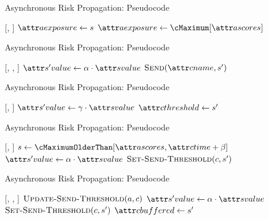 \documentclass[11pt]{beamer}
\begin{document}
\begin{frame}{Asynchronous Risk Propagation: Pseudocode}
\begin{function}{\nUpdateExposureScore}[\vActor, \vScore]
  \If{$\aActorExposureValue < \aScoreValue$}
    \pause
    \State $\aActorExposure \assign \vScore$
  \pause
    \pause
    \State $\aActorExposure \assign \cMaximum[\aActorScores]$
  \EndIf
\end{function}
\end{frame}

\begin{frame}{Asynchronous Risk Propagation: Pseudocode}
\begin{function}{\nApplyRiskScore}[\vActor, \vContact, \vScore]
  \If{$\aContactTime + \pTimeBuffer > \aScoreTime$}
    \pause
    \State $\aNewScoreValue \assign \pTransmissionRate \cdot \aScoreValue$
    \pause
    \State $\cSend[\aContactName, \vNewScore]$
  \EndIf
\end{function}
\end{frame}

\begin{frame}{Asynchronous Risk Propagation: Pseudocode}
\begin{function}{\nSetSendThreshold}[\vContact, \vScore]
  \State $\aNewScoreValue \assign \pSendCoefficient \cdot \aScoreValue$
  \pause
  \State $\aContactThreshold \assign \vNewScore$
\end{function}
\end{frame}

\begin{frame}{Asynchronous Risk Propagation: Pseudocode}
\begin{function}{\nUpdateSendThreshold}[\vActor, \vContact]
    \pause
      \pause
      \State $\vScore \assign \cMaximumOlderThan[\aActorScores, \aContactTime + \pTimeBuffer]$
        \pause
      \State $\aNewScoreValue \assign \pTransmissionRate \cdot \aScoreValue$
        \pause
      \State $\cSetSendThreshold[\vContact, \vNewScore]$
    \EndIf
  \EndIf
\end{function}
\end{frame}

\begin{frame}{Asynchronous Risk Propagation: Pseudocode}
\begin{function}{\nApplyRiskScore}[\vActor, \vContact, \vScore]
  \State $\cUpdateSendThreshold[\vActor, \vContact]$
  \pause
  \If{$\aContactThresholdValue < \aScoreValue \AND \aContactTime + \pTimeBuffer > \aScoreTime$}
    \pause
    \State $\aNewScoreValue \assign \pTransmissionRate \cdot \aScoreValue$
    \pause
    \State $\cSetSendThreshold[\vContact, \vNewScore]$
    \pause
    \State $\aContactBuffered \assign \vNewScore$
  \EndIf
\end{function}
\end{frame}
\end{document}
